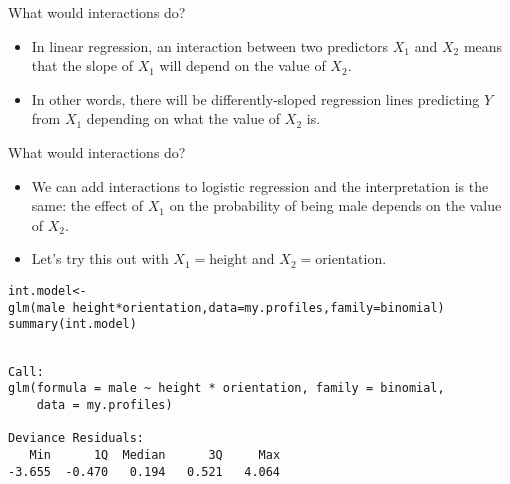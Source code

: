 \documentclass{beamer}\usepackage[]{graphicx}\usepackage[]{color}
\makeatletter
\newcommand{\hlopt}[1]{\textcolor[rgb]{1,0.894,0.769}{#1}}%
\newcommand{\hlstd}[1]{\textcolor[rgb]{1,0.894,0.769}{#1}}%
\newcommand{\hlkwb}[1]{\textcolor[rgb]{0.804,0.776,0.451}{#1}}%
\newcommand{\hlkwc}[1]{\textcolor[rgb]{0.78,0.941,0.545}{#1}}%
\newcommand{\hlkwd}[1]{\textcolor[rgb]{1,0.78,0.769}{#1}}%
\newenvironment{kframe}{%
 \def\at@end@of@kframe{}%
 \ifinner\ifhmode%
  \def\at@end@of@kframe{\end{minipage}}%
  \begin{minipage}{\columnwidth}%
 \fi\fi%
 \def\FrameCommand##1{\hskip\@totalleftmargin \hskip-\fboxsep
 \colorbox{shadecolor}{##1}\hskip-\fboxsep
     \hskip-\linewidth \hskip-\@totalleftmargin \hskip\columnwidth}%
 \MakeFramed {\advance\hsize-\width
   \@totalleftmargin\z@ \linewidth\hsize
   \@setminipage}}%
 {\par\unskip\endMakeFramed%
 \at@end@of@kframe}
\newenvironment{knitrout}{}{} %
\makeatother
\begin{document}
\begin{darkframes}
    \begin{frame}{What would interactions do?}
      \begin{itemize}
        \item In linear regression, an interaction between two predictors $X_1$ and $X_2$ means that the \alert{slope} of $X_1$ will depend on the \alert{value} of $X_2$.
        \item In other words, there will be differently-sloped regression lines predicting $Y$ from $X_1$ depending on what the value of $X_2$ is.
      \end{itemize}
    \end{frame}

    \begin{frame}
\begin{knitrout}


\end{knitrout}
    \end{frame}

    \begin{frame}{What would interactions do?}
      \begin{itemize}
        \item We can add interactions to logistic regression and the interpretation is the same: the effect of $X_1$ on the \alert{probability of being male} depends on the \alert{value} of $X_2$.
        \item Let's try this out with $X_1=\text{height}$ and $X_2=\text{orientation}$.
      \end{itemize}
    \end{frame}

    \begin{frame}[fragile]
      \fontvsm
\begin{knitrout}
\begin{kframe}
\begin{alltt}
\hlstd{int.model} \hlkwb{<-} \hlkwd{glm}\hlstd{(male} \hlopt{~} \hlstd{height} \hlopt{*} \hlstd{orientation,} \hlkwc{data}\hlstd{=my.profiles,} \hlkwc{family}\hlstd{=binomial)}
\hlkwd{summary}\hlstd{(int.model)}
\end{alltt}
\begin{verbatim}

Call:
glm(formula = male ~ height * orientation, family = binomial, 
    data = my.profiles)

Deviance Residuals: 
   Min      1Q  Median      3Q     Max  
-3.655  -0.470   0.194   0.521   4.064  


\end{verbatim}
\end{kframe}
\end{knitrout}
\end{frame}
\end{darkframes}
\end{document}
